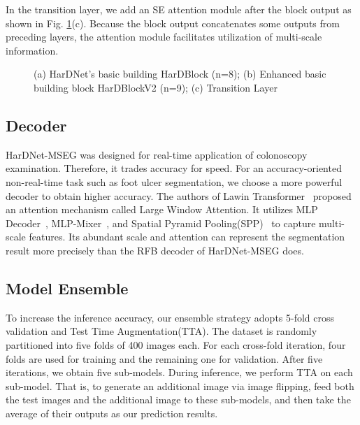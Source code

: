 \documentclass[runningheads]{llncs}
\begin{document}
  In the transition layer,
  we add an SE attention module \cite{SE} after
  the block output as shown in
  Fig. \ref{fig:block}(c).
  Because the block output concatenates
  some outputs from preceding layers,
  the attention module facilitates utilization of
  multi-scale information.
  
\begin{figure}[!ht]
    \begin{minipage}[b]{.5\linewidth}
    \centering
    
    \end{minipage}
    \medskip
    \begin{minipage}[b]{.7\linewidth}
    \centering
    \end{minipage}


    \caption{(a) HarDNet's basic building HarDBlock (n=8);
    (b) Enhanced basic building block HarDBlockV2 (n=9);
    (c) Transition Layer}
    \label{fig:block}
\end{figure}

\subsection{Decoder}

HarDNet-MSEG was designed for real-time application of
colonoscopy examination.
Therefore, it trades accuracy for speed.
For an accuracy-oriented non-real-time
task such as foot ulcer segmentation,
we choose a more powerful decoder to obtain higher accuracy.
The authors of Lawin Transformer~\cite{lawin} proposed
an attention mechanism called Large Window Attention.
It utilizes MLP Decoder~\cite{segformer}, MLP-Mixer~\cite{mlpmixer},
and Spatial Pyramid Pooling(SPP)~\cite{spp} to capture multi-scale features.
Its abundant scale and attention can
represent the segmentation result more precisely
than the RFB decoder of HarDNet-MSEG does.

\subsection{Model Ensemble}

To increase the inference accuracy,
our ensemble strategy adopts
5-fold cross validation and Test Time Augmentation(TTA).
The dataset is randomly partitioned into
five folds of 400 images each.
For each cross-fold iteration,
four folds are used for training and the remaining one for validation.
After five iterations, we obtain five sub-models.
During inference, we perform TTA on each sub-model.
That is, to generate an additional image via
image flipping,
feed both the test images and the additional image
to these sub-models, and
then take the average of their outputs as our prediction results.
\end{document}
